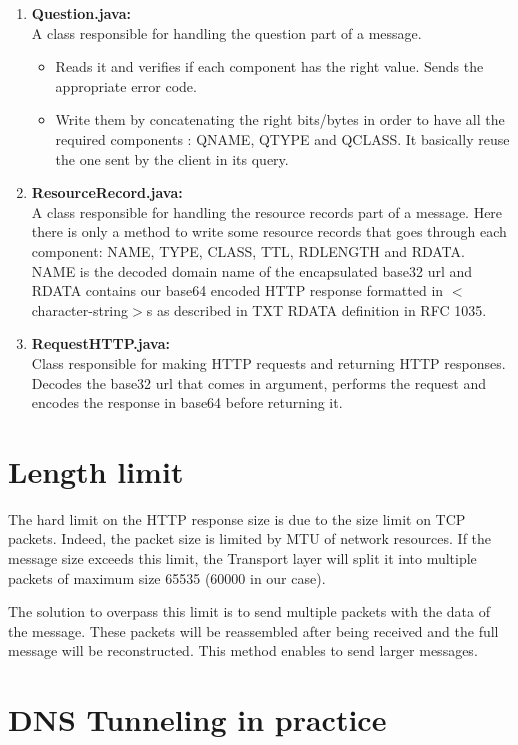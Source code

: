 \documentclass[a4paper, 11pt]{article}
\begin{document}
\begin{enumerate}
\begin{itemize}
    \end{itemize}
    \item \textbf{Question.java:}\\
    A class responsible for handling the question part of a message.
    \begin{itemize}
        \item Reads it and verifies if each component has the right value. Sends the appropriate error code.
        \item Write them by concatenating the right bits/bytes in order to have all the required components : QNAME, QTYPE and QCLASS. It basically reuse the one sent by the client in its query.
    \end{itemize}
    \item \textbf{ResourceRecord.java:}\\
    A class responsible for handling the resource records part of a message. Here there is only a method to write some resource records that goes through each component: NAME, TYPE, CLASS, TTL, RDLENGTH and RDATA. NAME is the decoded domain name of the encapsulated base32 url and RDATA contains our base64 encoded HTTP response formatted in $<$character-string$>$s as described in TXT RDATA definition in RFC 1035.
    \item \textbf{RequestHTTP.java:}\\
    Class responsible for making HTTP requests and returning HTTP responses. Decodes the base32 url that comes in argument, performs the request and encodes the response in base64 before returning it.

\end{enumerate}

\section{Length limit}

The hard limit on the HTTP response size is due to the size limit on TCP packets. Indeed, the packet size is limited by MTU of network resources. If the message size exceeds this limit, the Transport layer will split it into multiple packets of maximum size 65535 (60000 in our case). 

The solution to overpass this limit is to send multiple packets with the data of the message. These packets will be reassembled after being received and the full message will be reconstructed. This method enables to send larger messages.

\section{DNS Tunneling in practice}
\end{document}
